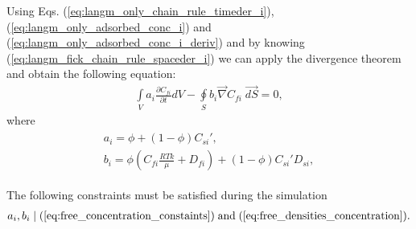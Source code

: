\documentclass[a4paper,14pt,english]{extreport}
\begin{document}
Using Eqs. (\ref{eq:langm_only_chain_rule_timeder_i}), (\ref{eq:langm_only_adsorbed_conc_i}) and (\ref{eq:langm_only_adsorbed_conc_i_deriv}) and by knowing (\ref{eq:langm_fick_chain_rule_spaceder_i}) we can apply the divergence theorem and obtain the following equation:
\begin{eqnarray}
\label{eq:langm_fick_diffusivity_simplified_integral}
\int \limits_{V} a_{i} \frac{\partial C_{fi}}{\partial t} d V - \oint \limits_{S} b_{i} \vec{\nabla}C_{fi} \; \vec{dS} =  \mathit{0},
\end{eqnarray}
where  
\begin{eqnarray}
\begin{gathered}
\label{eq:langm_fick_diffusivity_a_b_coeffs}
a_{i}  =  \phi + \left(\mathit{1}-\phi \right)C_{si}', \\ 
b_{i}  = \phi \left(C_{fi} \frac{RTk}{\mu} + D_{fi}\right) + \left(\mathit{1}-\phi \right) C_{si}'D_{si},
\end{gathered}
\end{eqnarray}

The following constraints must be satisfied during the simulation
\begin{eqnarray}
\label{eq:angm_fick_concentration_constaints}
a_{i}, b_{i} \mid  (\ref{eq:free_concentration_constaints}) \; \text{and} \; (\ref{eq:free_densities_concentration}).
\end{eqnarray}
 
\end{document}

